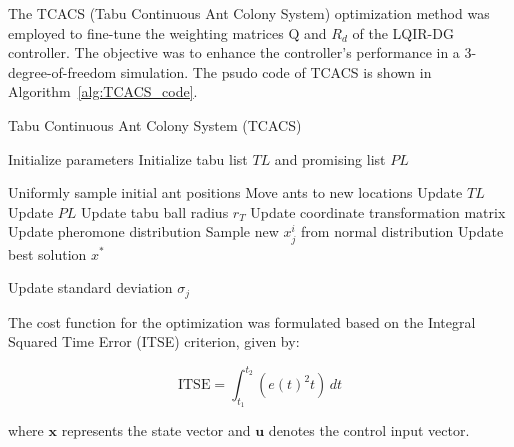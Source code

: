 \documentclass[3p]{elsarticle}
\begin{document}
The TCACS (Tabu Continuous Ant Colony System) optimization method was employed to fine-tune the weighting matrices $\boldsymbol{\mathrm{Q}}$ and $R_d$ of the LQIR-DG controller. The objective was to enhance the controller's performance in a 3-degree-of-freedom simulation. %
The psudo code of TCACS is shown in Algorithm~\ref{alg:TCACS_code}.
\begin{algorithm}
    \caption{Tabu Continuous Ant Colony System (TCACS)}
    \begin{algorithmic}[1]
    \State Initialize parameters
    \State Initialize tabu list $TL$ and promising list $PL$
    
    
    \State Uniformly sample initial ant positions
    \Else
    \State Move ants to new locations
    \EndIf
    \State Update $TL$
    \State Update $PL$
    \State Update tabu ball radius $r_T$
    \State Update coordinate transformation matrix
    \State Update pheromone distribution
    \EndWhile
    \EndProcedure
    \Repeat
    \State Sample new $x_j^i$ from normal distribution
    \EndFor
    \EndFor
    \EndProcedure
    \State Update best solution $x^*$
    
    \State Update standard deviation $\sigma_j$
    \EndFor
    \EndProcedure
    \end{algorithmic}
    \label{alg:TCACS_code}
\end{algorithm}

The cost function for the optimization was formulated based on the Integral Squared Time Error (ITSE) criterion, given by:

\begin{equation*}
    \text{ITSE} = \int_{t_1}^{t_2} \left( e(t)^2t \right) \, dt
\end{equation*}

where $\mathbf{x}$ represents the state vector and $\mathbf{u}$ denotes the control input vector.
\end{document}

